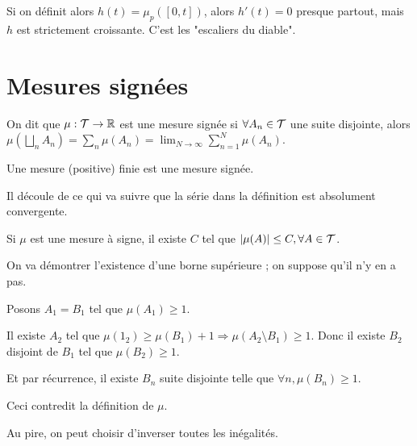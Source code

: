 \documentclass[10pt,a4paper,notitlepage ]{report}
\begin{document}
\begin{rem}
	Si on définit alors $h(t) = \mu_p([0,t])$, alors $h'(t)=0$ presque partout, mais $h$ est strictement croissante. C'est les "escaliers du diable".
\end{rem}

\section{Mesures signées}

\begin{definition}
	On dit que $\mu : \mathcal T \rightarrow \mathbb R$ est une mesure signée si $\forall A_n\in\mathcal T$ une suite disjointe, alors $\mu(\bigsqcup_n A_n)= \sum_n\mu(A_n) = \lim_{N\rightarrow \infty}\sum_{n=1}^N \mu(A_n)$.
\end{definition}

\begin{rem}
	Une mesure (positive) finie est une mesure signée.
\end{rem}
\begin{rem}
	Il découle de ce qui va suivre que la série dans la définition est absolument convergente.
\end{rem}

\begin{lemme}
	Si $\mu$ est une mesure à signe, il existe $C$ tel que $|\mu(A)|\le C, \forall A \in \mathcal T$.
\end{lemme}

\begin{demo}
	On va démontrer l'existence d'une borne supérieure ; on suppose qu'il n'y en a pas.
	
	Posons $A_1=B_1$ tel que $\mu(A_1) \ge 1$.
	
	Il existe $A_2$ tel que $\mu(1_2)\ge \mu(B_1) + 1 \Rightarrow \mu(A_2\setminus B_1) \ge 1$.
	Donc il existe $B_2$ disjoint de $B_1$ tel que $\mu(B_2) \ge 1$.
	
	Et par récurrence, il existe $B_n$ suite disjointe telle que $\forall n, \mu(B_n) \ge 1$.
	
	Ceci contredit la définition de $\mu$.
	
	Au pire, on peut choisir d'inverser toutes les inégalités.
\end{demo}
\end{document}
